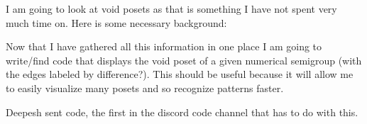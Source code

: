 I am going to look at void posets as that is something I have not spent very much time on. Here is some necessary background:





Now that I have gathered all this information in one place I am going to write/find code that displays the void poset of a given numerical semigroup (with the edges labeled by difference?). This should be useful because it will allow me to easily visualize many posets and so recognize patterns faster. 

Deepesh sent code, the first in the discord code channel that has to do with this. 





